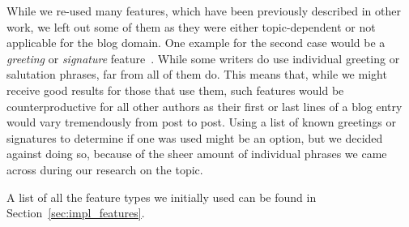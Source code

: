 While we re-used many features, which have been previously described in other work, we left out some of them as they were either topic-dependent or not applicable for the blog domain.
One example for the second case would be a \textit{greeting} or \textit{signature} feature~\cite{de2001mining}.
While some writers do use individual greeting or salutation phrases, far from all of them do.
This means that, while we might receive good results for those that use them, such features would be counterproductive for all other authors as their first or last lines of a blog entry would vary tremendously from post to post.
Using a list of known greetings or signatures to determine if one was used might be an option, but we decided against doing so, because of the sheer amount of individual phrases we came across during our research on the topic.

A list of all the feature types we initially used can be found in Section~\ref{sec:impl_features}.
